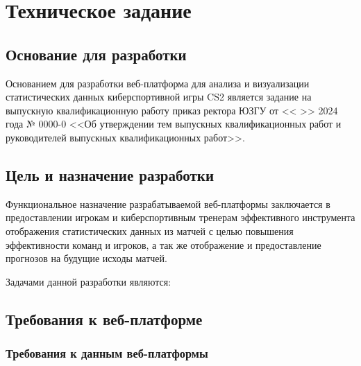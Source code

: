 \newsection
\section{Техническое задание}
\subsection{Основание для разработки}

Основанием для разработки веб-платформа для анализа и визуализации статистических данных киберспортивной игры CS2 является задание на выпускную квалификационную работу приказ ректора ЮЗГУ от <<  >>     2024 года № 0000-0 <<Об утверждении тем выпускных квалификационных работ и руководителей выпускных квалификационных работ>>.

\subsection{Цель и назначение разработки}

Функциональное назначение разрабатываемой веб-платформы заключается в предоставлении игрокам и киберспортивным тренерам эффективного инструмента отображения статистических данных из матчей с целью повышения эффективности команд и игроков, а так же отображение и предоставление прогнозов на будущие исходы матчей.

Задачами данной разработки являются:

\subsection{Требования к веб-платформе}

\subsubsection{Требования к данным веб-платформы}

